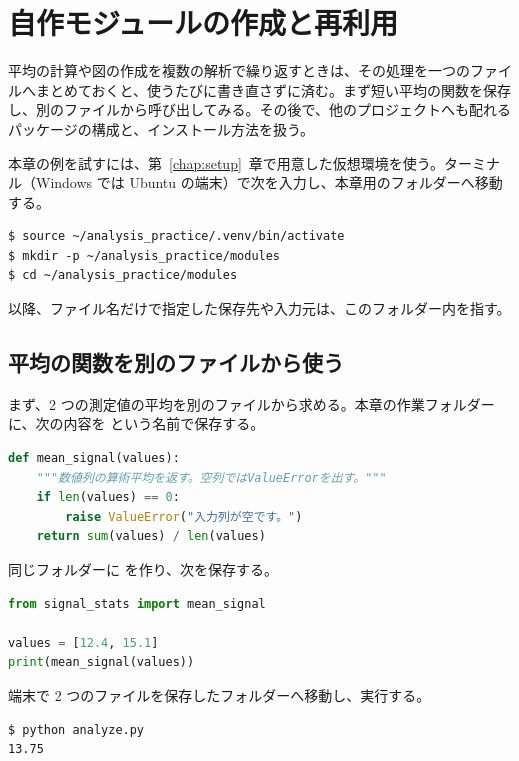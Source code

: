 \chapter{自作モジュールの作成と再利用}
\label{ch:modules}

平均の計算や図の作成を複数の解析で繰り返すときは、その処理を一つのファイルへまとめておくと、使うたびに書き直さずに済む。まず短い平均の関数を保存し、別のファイルから呼び出してみる。その後で、他のプロジェクトへも配れるパッケージの構成と、インストール方法を扱う。

本章の例を試すには、第~\ref{chap:setup}~章で用意した仮想環境を使う。ターミナル（Windows では Ubuntu の端末）で次を入力し、本章用のフォルダーへ移動する。

\begin{lstlisting}[numbers=none, xleftmargin=2\zw]
$ source ~/analysis_practice/.venv/bin/activate
$ mkdir -p ~/analysis_practice/modules
$ cd ~/analysis_practice/modules
\end{lstlisting}

以降、ファイル名だけで指定した保存先や入力元は、このフォルダー内を指す。

\section{平均の関数を別のファイルから使う}

まず、2 つの測定値の平均を別のファイルから求める。本章の作業フォルダー  に、次の内容を  という名前で保存する。

\begin{lstlisting}[language=Python, title={signal\_stats.py}]
def mean_signal(values):
    """数値列の算術平均を返す。空列ではValueErrorを出す。"""
    if len(values) == 0:
        raise ValueError("入力列が空です。")
    return sum(values) / len(values)
\end{lstlisting}

同じフォルダーに  を作り、次を保存する。

\begin{lstlisting}[language=Python, title={analyze.py}]
from signal_stats import mean_signal

values = [12.4, 15.1]
print(mean_signal(values))
\end{lstlisting}

端末で 2 つのファイルを保存したフォルダーへ移動し、実行する。

\begin{lstlisting}[numbers=none, xleftmargin=2\zw]
$ python analyze.py
13.75
\end{lstlisting}


